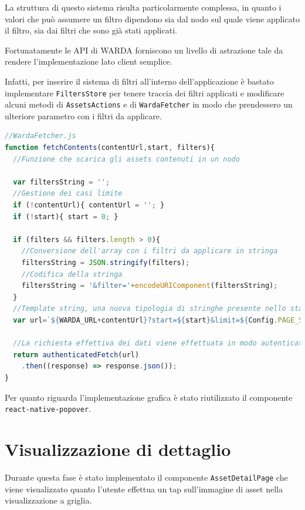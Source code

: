 La struttura di questo sistema risulta particolarmente complessa, in quanto i valori che può assumere un filtro dipendono sia dal nodo sul quale viene applicato il filtro, sia dai filtri che sono già stati applicati.

Fortunatamente le API di WARDA forniscono un livello di astrazione tale da rendere l'implementazione lato client semplice.

Infatti, per inserire il sistema di filtri all'interno dell'applicazione è bastato implementare \texttt{FiltersStore} per tenere traccia dei filtri applicati e modificare alcuni metodi di \texttt{AssetsActions} e di \texttt{WardaFetcher} in modo che prendessero un ulteriore parametro con i filtri da applicare.

\begin{lstlisting}[language=JavaScript, caption=WardaFetcher - Caricamento degli assets considerando i filtri]
//WardaFetcher.js
function fetchContents(contentUrl,start, filters){
  //Funzione che scarica gli assets contenuti in un nodo

  var filtersString = '';
  //Gestione dei casi limite
  if (!contentUrl){ contentUrl = ''; }
  if (!start){ start = 0; }

  if (filters && filters.length > 0){
    //Conversione dell'array con i filtri da applicare in stringa
    filtersString = JSON.stringify(filters);
    //Codifica della stringa
    filtersString = '&filter='+encodeURIComponent(filtersString);
  }
  //Template string, una nuova tipologia di stringhe presente nello standard ES6 di JavaScript, le variabili presenti all'interno del blocco ${ } vengono sostituite con il loro valore
  var url=`${WARDA_URL+contentUrl}?start=${start}&limit=${Config.PAGE_SIZE}${filtersString}`;

  //La richiesta effettiva dei dati viene effettuata in modo autenticato
  return authenticatedFetch(url)
    .then((response) => response.json());
}
\end{lstlisting}

Per quanto riguarda l'implementazione grafica è stato riutilizzato il componente \texttt{react-native-popover}.

\section{Visualizzazione di dettaglio}

Durante questa fase è stato implementato il componente \texttt{AssetDetailPage} che viene visualizzato quanto l'utente effettua un tap sull'immagine di asset nella visualizzazione a griglia. 

